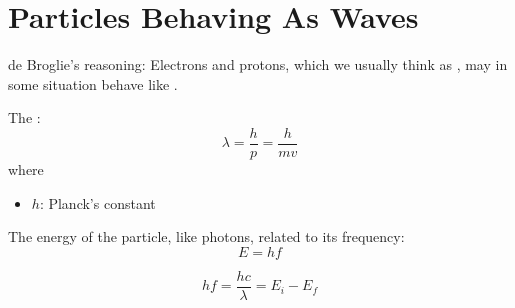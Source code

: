 \chapter{Particles Behaving As Waves}

  \par de Broglie's reasoning: Electrons and protons, which we usually think
    as , may in some situation behave like .
  \par The :
  \begin{equation}
    \lambda = \frac{h}{p} = \frac{h}{mv}
  \end{equation}
  where
  \begin{itemize}
    \item $h$: Planck's constant
  \end{itemize}
  \par The energy of the particle, like photons, related to its frequency:
  \begin{equation}
    E = hf
  \end{equation}

  \begin{equation}
    hf = \frac{hc}{\lambda} = E_{i} - E_{f}
  \end{equation}

